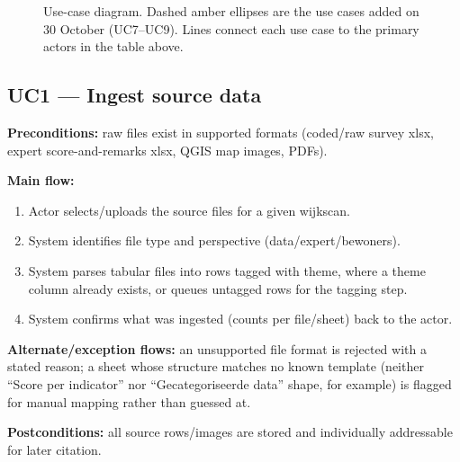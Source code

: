\begin{figure}[ht]
\caption{Use-case diagram. Dashed amber ellipses are the use cases added on 30 October (UC7--UC9). Lines connect each use case to the primary actors in the table above.}
\label{fig:ucd}
\end{figure}

\newcommand{\ucfield}[1]{\par\smallskip\noindent\textbf{\color{dknavy}#1}\quad}
\newcommand{\impl}[2]{\begin{calloutbox}{teal}{Implementation, 30 October: #1}#2\end{calloutbox}}

\subsection{UC1 --- Ingest source data}
\ucfield{Preconditions:} raw files exist in supported formats (coded/raw survey xlsx, expert score-and-remarks xlsx, QGIS map images, PDFs).
\ucfield{Main flow:}
\begin{enumerate}
\item Actor selects/uploads the source files for a given wijkscan.
\item System identifies file type and perspective (data/expert/bewoners).
\item System parses tabular files into rows tagged with theme, where a theme column already exists, or queues untagged rows for the tagging step.
\item System confirms what was ingested (counts per file/sheet) back to the actor.
\end{enumerate}
\ucfield{Alternate/exception flows:} an unsupported file format is rejected with a stated reason; a sheet whose structure matches no known template (neither ``Score per indicator'' nor ``Gecategoriseerde data'' shape, for example) is flagged for manual mapping rather than guessed at.
\ucfield{Postconditions:} all source rows/images are stored and individually addressable for later citation.


